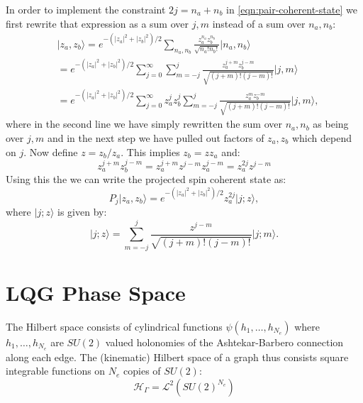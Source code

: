 \documentclass[twocolumn,draft,aps,nofootinbib,nobibnotes,final]{revtex4-2}
\newcommand{\mc}[1]{\mathcal{#1}}
\newcommand{\ket}[1]{\vert #1 \rangle}
\begin{document}
In order to implement the constraint $ 2j = n_a + n_b $ in \eqref{eqn:pair-coherent-state} we first rewrite that expression as a sum over $ j,m $ instead of a sum over $ n_a, n_b $:
\begin{align}
	& \ket{z_a, z_b} = e^{-(|z_a|^2 + |z_b|^2)/2} \sum_{n_a, n_b} \frac{z_a^{n_a} z_b^{n_b}}{\sqrt{n_a! n_b!}} \ket{n_a, n_b} \nonumber \\
 	& = e^{-(|z_a|^2 + |z_b|^2)/2} \sum_{j=0}^{\infty} \sum_{m=-j}^{j} \frac{z_a^{j+m} z_b^{j-m}}{\sqrt{(j+m)! (j-m)!}} \ket{j, m} \nonumber \\
	& = e^{-(|z_a|^2 + |z_b|^2)/2} \sum_{j=0}^{\infty} z_a^j z_b^j \sum_{m=-j}^{j} \frac{z_a^m z_b^{-m}}{\sqrt{(j+m)! (j-m)!}} \ket{j, m},
\end{align}
where in the second line we have simply rewritten the sum over $ n_a, n_b $ as being over $ j,m $ and in the next step we have pulled out factors of $ z_a, z_b $ which depend on $ j $. Now define $ z = z_b/z_a $. This implies $ z_b = z z_a $ and:
\begin{equation*}
	z_a^{j+m} z_b^{j-m} = z_a^{j+m} z^{j-m} z_a^{j-m} = z_a^{2j} z^{j-m}
\end{equation*}
Using this the we can write the projected spin coherent state as:
\begin{equation}
	P_j \ket{z_a, z_b} = e^{-(|z_a|^2 + |z_b|^2)/2} z_a^{2j} \ket{j;z},
\end{equation}
where $ \ket{j;z} $ is given by:
\begin{equation}
	\ket{j;z} = \sum_{m=-j}^{j} \frac{z^{j-m}}{\sqrt{(j+m)! (j-m)!}} \ket{j;m}.
\end{equation}

\section{LQG Phase Space}\label{sec:lqg-phase-space}

The Hilbert space consists of cylindrical functions $ \psi(h_1, \ldots, h_{N_e}) $ where $ h_1, \ldots, h_{N_e} $ are $ SU(2) $ valued holonomies of the Ashtekar-Barbero connection along each edge. The (kinematic) Hilbert space of a graph thus consists square integrable functions on $ N_e $ copies of $ SU(2) $:
\begin{equation}\label{eqn:lqg-hilbert-1}
	\mc H_\Gamma = \mc L^2(SU(2)^{N_e})
\end{equation}
\end{document}

